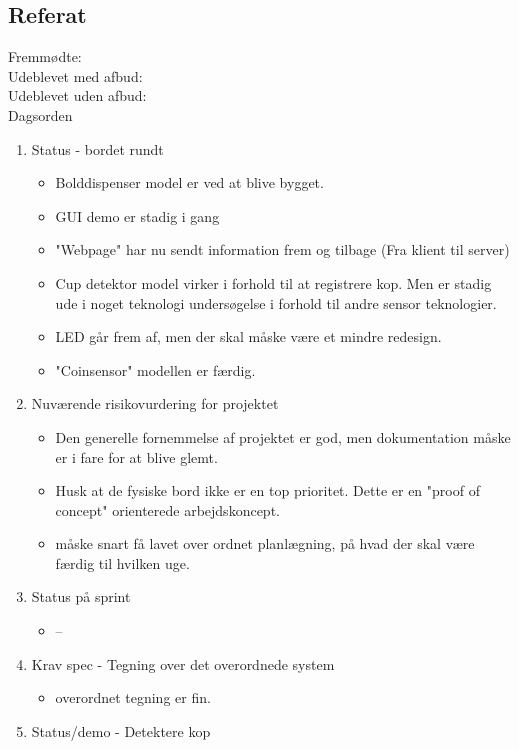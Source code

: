 \subsection{Referat}
 Fremmødte: 
 \\Udeblevet med afbud:
 \\Udeblevet uden afbud: 
 \\Dagsorden 
 \begin{enumerate}
    \item Status - bordet rundt
    \begin{itemize}
        \item Bolddispenser model er ved at blive bygget. 
        \item GUI demo er stadig i gang 
        \item "Webpage" har nu sendt information frem og tilbage (Fra klient til server)
        \item Cup detektor model virker i forhold til at registrere kop. Men er stadig ude i noget teknologi undersøgelse i forhold til andre sensor teknologier. 
        \item LED går frem af, men der skal måske være et mindre redesign.
        \item "Coinsensor" modellen er færdig.
    \end{itemize}
    \item Nuværende risikovurdering for projektet
        \begin{itemize}
            \item Den generelle fornemmelse af projektet er god, men dokumentation måske er i fare for at blive glemt. 
            \item Husk at de fysiske bord ikke er en top prioritet. Dette er en "proof of concept" orienterede arbejdskoncept. 
            \item måske snart få lavet over ordnet planlægning, på hvad der skal være færdig til hvilken uge.
        \end{itemize}
    \item Status på sprint
        \begin{itemize}
            \item --
        \end{itemize}
    \item Krav spec - Tegning over det overordnede system
        \begin{itemize}
            \item overordnet tegning er fin.
        \end{itemize}
    \item Status/demo - Detektere kop

\end{enumerate}
